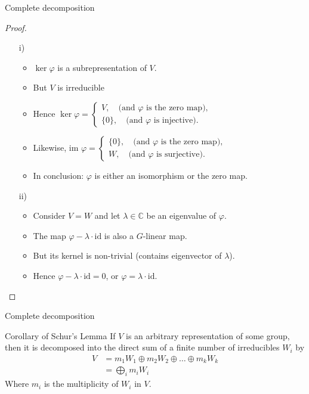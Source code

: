 \documentclass[10pt]{beamer}
\newcommand{\id}{\text{id}}
\newcommand{\CC}{\mathbb{C}}
\begin{document}
	\begin{frame}{Complete decomposition}
		\begin{proof}
			\begin{itemize}
				\item[i)] \begin{itemize}
					\item $\ker\varphi$ is a subrepresentation of $V$.\pause
					\item But $V$ is irreducible
					\item Hence $\ker \varphi = \begin{cases}
						V, \quad \text{(and $\varphi$ is the zero map),} \\
						\{0\}, \quad \text{(and $\varphi$ is injective)}.
					\end{cases}$\pause
					\item Likewise, $\text{im } \varphi = \begin{cases}
						\{0\}, \quad \text{(and $\varphi$ is the zero map)}, \\
						W, \quad \text{(and $\varphi$ is surjective)}.
					\end{cases}$\pause
					\item In conclusion: $\varphi$ is either an isomorphism or the zero map.
				\end{itemize}\pause
				\item[ii)] \begin{itemize}
					\item Consider $V = W$ and let $\lambda \in \CC$ be an eigenvalue of $\varphi$.\pause
					
					\item The map $\varphi - \lambda \cdot \id$ is also a $G$-linear map.\pause
					
					\item But its kernel is non-trivial (contains eigenvector of $\lambda$).\pause
					
					\item Hence $\varphi - \lambda \cdot \id = 0$, or $\varphi = \lambda \cdot \id$. \qedhere
				\end{itemize}
			\end{itemize}
		\end{proof}
	\end{frame}
	\begin{frame}{Complete decomposition}
		\begin{block}{Corollary of Schur's Lemma}
			If $V$ is an arbitrary representation of some group, then it is decomposed into the direct sum of a finite number of irreducibles $W_i$ by 
			\begin{align*}
				V &= m_1W_1 \oplus m_2W_2 \oplus \dots \oplus m_kW_k \\
				&= \bigoplus_i m_i W_i
			\end{align*}
			Where $m_i$ is the multiplicity of $W_i$ in $V$.
		\end{block}
	\end{frame}
	
\end{document}
